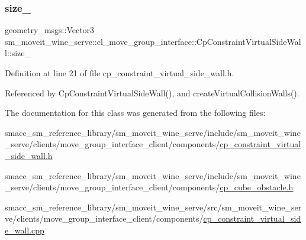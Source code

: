 \mbox{\label{classsm__moveit__wine__serve_1_1cl__move__group__interface_1_1CpConstraintVirtualSideWall_af00e8ef9042a797b749888256e0d36f4}} 
\subsubsection{\texorpdfstring{size\+\_\+}{size\_}}
{\footnotesize\ttfamily geometry\+\_\+msgs\+::\+Vector3 sm\+\_\+moveit\+\_\+wine\+\_\+serve\+::cl\+\_\+move\+\_\+group\+\_\+interface\+::\+Cp\+Constraint\+Virtual\+Side\+Wall\+::size\+\_\+\hspace{0.3cm}{\ttfamily [private]}}



Definition at line 21 of file cp\+\_\+constraint\+\_\+virtual\+\_\+side\+\_\+wall.\+h.



Referenced by Cp\+Constraint\+Virtual\+Side\+Wall(), and create\+Virtual\+Collision\+Walls().



The documentation for this class was generated from the following files\+:\begin{DoxyCompactItemize}
\item 
smacc\+\_\+sm\+\_\+reference\+\_\+library/sm\+\_\+moveit\+\_\+wine\+\_\+serve/include/sm\+\_\+moveit\+\_\+wine\+\_\+serve/clients/move\+\_\+group\+\_\+interface\+\_\+client/components/\hyperlink{sm__moveit__wine__serve_2include_2sm__moveit__wine__serve_2clients_2move__group__interface__cliefeb1153c465141f08019b3a2f95ff85a}{cp\+\_\+constraint\+\_\+virtual\+\_\+side\+\_\+wall.\+h}\item 
smacc\+\_\+sm\+\_\+reference\+\_\+library/sm\+\_\+moveit\+\_\+wine\+\_\+serve/include/sm\+\_\+moveit\+\_\+wine\+\_\+serve/clients/move\+\_\+group\+\_\+interface\+\_\+client/components/\hyperlink{cp__cube__obstacle_8h}{cp\+\_\+cube\+\_\+obstacle.\+h}\item 
smacc\+\_\+sm\+\_\+reference\+\_\+library/sm\+\_\+moveit\+\_\+wine\+\_\+serve/src/sm\+\_\+moveit\+\_\+wine\+\_\+serve/clients/move\+\_\+group\+\_\+interface\+\_\+client/components/\hyperlink{sm__moveit__wine__serve_2src_2sm__moveit__wine__serve_2clients_2move__group__interface__client_2f063bdb6f1514bbeea825cd3df37778f}{cp\+\_\+constraint\+\_\+virtual\+\_\+side\+\_\+wall.\+cpp}\end{DoxyCompactItemize}
